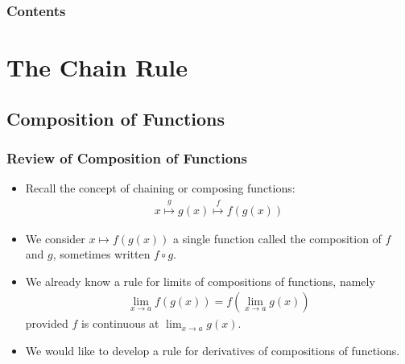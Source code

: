 \documentclass[serif,ignorenonframetext]{beamer}
\title{\commonTitleZeroTwoFive}
\subtitle{\commonSubtitleZeroTwoFive}
\author{\commonAuthor}
\institute{\commonInstitute}
\date{\commonDateZeroTwoFive}
\newcommand{\ds}{\displaystyle}
\begin{document}

\begin{frame}
  \titlepage
\end{frame}

\begin{frame}
  \frametitle{Contents}
  \tableofcontents
\end{frame}



\section{The Chain Rule}

\subsection{Composition of Functions}

\begin{frame}
  \frametitle{Review of Composition of Functions}
  \begin{itemize}[<+->]
  \item Recall the concept of chaining or composing functions:
    \begin{align*}
      x \stackrel{g}{\mapsto} g(x) \stackrel{f}{\mapsto} f(g(x))
    \end{align*}
  \item We consider $\ds x\mapsto f(g(x))$ a single function called
    the composition of $f$ and $g$, sometimes written $f\circ g$.
  \item We already know a rule for limits of compositions of functions,
    namely
    \begin{align*}
      \lim_{x\to a} f(g(x)) = f(\lim_{x\to a} g(x))
    \end{align*}
    provided $f$ is continuous at $\ds\lim_{x\to a} g(x)$.
  \item We would like to develop a rule for derivatives of compositions
    of functions.
  \end{itemize}
\end{frame}
\end{document}
